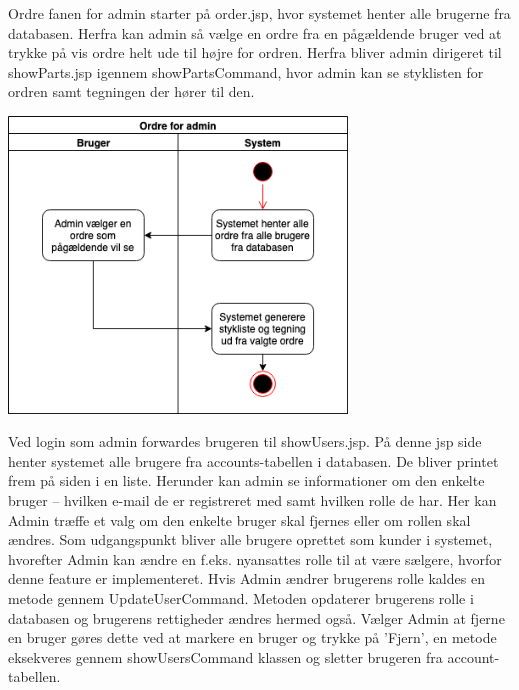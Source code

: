 \documentclass[11pt]{report}
\begin{document}
Ordre fanen for admin starter på order.jsp, hvor systemet henter alle brugerne fra databasen. Herfra kan admin så vælge en ordre fra en pågældende bruger ved at trykke på vis ordre helt ude til højre for ordren. Herfra bliver admin dirigeret til showParts.jsp igennem showPartsCommand, hvor admin kan se styklisten for ordren samt tegningen der hører til den. \\
\begin{center}
\includegraphics[width=9cm]{OrdreAdmin.png}
\end{center}
\newpage
\noindent Ved login som admin forwardes brugeren til showUsers.jsp. På denne jsp side henter systemet alle brugere fra accounts-tabellen i databasen. De bliver printet frem på siden i en liste. Herunder kan admin se informationer om den enkelte bruger – hvilken e-mail de er registreret med samt hvilken rolle de har. Her kan Admin træffe et valg om den enkelte bruger skal fjernes eller om rollen skal ændres. Som udgangspunkt bliver alle brugere oprettet som kunder i systemet, hvorefter Admin kan ændre en f.eks. nyansattes rolle til at være sælgere, hvorfor denne feature er implementeret. Hvis Admin ændrer brugerens rolle kaldes en metode gennem UpdateUserCommand. Metoden opdaterer brugerens rolle i databasen og brugerens rettigheder ændres hermed også.
Vælger Admin at fjerne en bruger gøres dette ved at markere en bruger og trykke på ’Fjern’, en metode eksekveres gennem showUsersCommand klassen og sletter brugeren fra account-tabellen. \\
\end{document}
